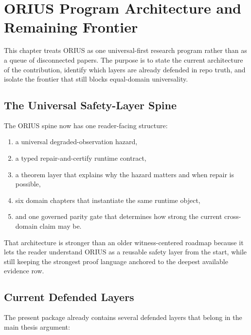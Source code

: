 \chapter{ORIUS Program Architecture and Remaining Frontier}
\label{ch:roadmap}

This chapter treats ORIUS as one universal-first research program rather than
as a queue of disconnected papers. The purpose is to state the current
architecture of the contribution, identify which layers are already defended in
repo truth, and isolate the frontier that still blocks equal-domain
universality.

\section{The Universal Safety-Layer Spine}

The ORIUS spine now has one reader-facing structure:

\begin{enumerate}
  \item a universal degraded-observation hazard,
  \item a typed repair-and-certify runtime contract,
  \item a theorem layer that explains why the hazard matters and when repair is
    possible,
  \item six domain chapters that instantiate the same runtime object,
  \item and one governed parity gate that determines how strong the current
    cross-domain claim may be.
\end{enumerate}

That architecture is stronger than an older witness-centered roadmap because it
lets the reader understand ORIUS as a reusable safety layer from the start,
while still keeping the strongest proof language anchored to the deepest
available evidence row.

\section{Current Defended Layers}

The present package already contains several defended layers that belong in the
main thesis argument:

